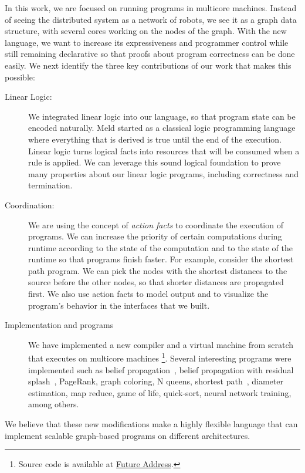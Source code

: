 In this work, we are focused on running \lang programs in multicore machines.
Instead of seeing the distributed system as a network of robots, we see it as a graph data structure,
with several cores working on the nodes of the graph. With the new language, we want to increase its expressiveness and
programmer control while still remaining declarative so that proofs about program correctness can be done easily.
We next identify the three key contributions of our work that makes this possible:

\begin{description}
   \item[Linear Logic:] We integrated linear logic into our language, so that program state can be encoded naturally.
   Meld started as a classical logic programming language where everything that is derived is true until the end
   of the execution. Linear logic turns logical facts into resources that will be consumed when a rule is applied.
   We can leverage this sound logical foundation to prove many properties about our linear logic programs, including correctness and termination.
   \item[Coordination:] We are using the concept of \emph{action facts} to coordinate the execution of programs.
   We can increase the priority of certain computations during runtime according to the state
   of the computation and to the state of the runtime so that programs finish faster.
   For example, consider the shortest path program. We can pick the nodes with the shortest
   distances to the source before the other nodes, so that shorter distances are propagated first.
   We also use action facts to model output and to visualize the program's behavior in the interfaces
   that we built.
   \item[Implementation and programs] We have implemented a new compiler and a virtual machine from scratch that executes on multicore machines
   \footnote{Source code is available at \url{Future Address}.}.
   Several interesting programs were implemented such as belief propagation~\cite{Gonzalez+al:aistats09paraml},
   belief propagation with residual splash~\cite{Gonzalez+al:aistats09paraml}, PageRank, graph coloring,
   N queens, shortest path~\cite{Dijkstra}, diameter estimation, map reduce, game of life, quick-sort, neural network training, among others.
\end{description}

We believe that these new modifications make \lang a highly flexible language that can implement scalable graph-based programs
on different architectures.

